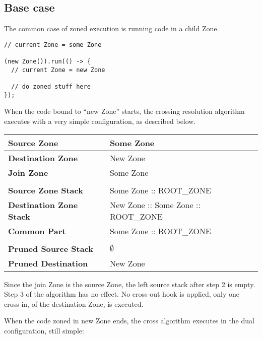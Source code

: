 \subsection*{Base case}

The common case of zoned execution is running code in a child Zone.

\begin{lstlisting}
// current Zone = some Zone

(new Zone()).run(() -> {
  // current Zone = new Zone

  // do zoned stuff here
});
\end{lstlisting}



When the code bound to ``new Zone'' starts, the crossing resolution algorithm executes with a very simple configuration, as described below.

\begin{tabular}{| l | l |}
\hline
\textbf{Source Zone} & Some Zone
\\ \hline
\textbf{Destination Zone} & New Zone
\\ \hline
\textbf{Join Zone} & Some Zone
\\ \hline
\multicolumn{2}{l}{}
\\ \hline
\textbf{Source Zone Stack} & Some Zone :: ROOT\_ZONE
\\ \hline
\textbf{Destination Zone Stack} & New Zone :: Some Zone :: ROOT\_ZONE
\\ \hline
\textbf{Common Part} & Some Zone :: ROOT\_ZONE
\\ \hline
\multicolumn{2}{l}{}
\\ \hline
\textbf{Pruned Source Stack} & $\emptyset$
\\ \hline
\textbf{Pruned Destination} & New Zone
\\ \hline
\end{tabular}

Since the join Zone is the source Zone, the left source stack after step 2 is empty. Step 3 of the algorithm has no effect. No cross-out hook is applied, only one cross-in, of the destination Zone, is executed.

When the code zoned in new Zone ends, the cross algorithm executes in the dual configuration, still simple:

